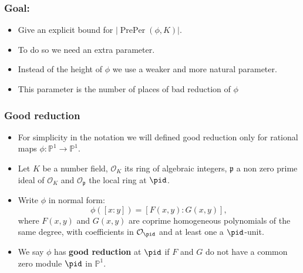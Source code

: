 \documentclass{beamer}
\DeclareMathOperator{\PrePer}{PrePer}
\theoremstyle{thmstyle}
\theoremstyle{mystyle}
\theoremstyle{qstnstyle}
\begin{document}
\begin{frame}
\frametitle{Goal:}

\begin{itemize}


\item Give an explicit bound for $|\PrePer(\phi,K)|$.

\vspace{10mm} 

\item To do so we need an extra parameter. 

\vspace{10mm} 

\item Instead of the height of $\phi$ we use a weaker and more natural parameter.
\vspace{10mm} 



\item This parameter is the number of places of bad reduction of $\phi$

\end{itemize}


\end{frame}

\begin{frame}
\frametitle{Good reduction}

\begin{itemize}
\item For simplicity in the notation we will defined good reduction only for rational maps $\phi:\mathbb{P}^1\to\mathbb{P}^1$. \pause
\item Let $K$ be a number field, $\mathcal{O}_K$ its ring of algebraic integers, $\mathfrak{p}$ a non zero prime ideal of $\mathcal{O}_K$
and $\mathcal{O}_{\mathfrak{p}}$ the local ring at $\pid$. \pause
\item Write $\phi$ in normal form: 
$$\phi([x : y]) = [F(x, y): G(x, y)],$$
where $F(x, y)$ and $G(x, y)$ are coprime
homogeneous polynomials of the same degree, with coefficients in $\mathcal{O}_\pid$ and at least one a $\pid$-unit. \pause
\item We say $\phi$ has \textbf{good reduction} at $\pid$ if $F$ and $G$ do not have a common zero module $\pid$ in $\mathbb{P}^1$.   

\end{itemize}
\end{frame}
\end{document}
